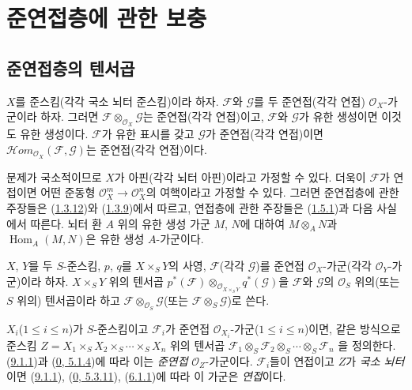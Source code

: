 \section{준연접층에 관한 보충}
\label{section:I.9-ko}

\subsection{준연접층의 텐서곱}
\label{subsection:I.9.1-ko}

\begin{proposition}[9.1.1]
\label{I.9.1.1-ko}
$X$를 준스킴(각각 국소 뇌터 준스킴)이라 하자. $\mathscr{F}$와
$\mathscr{G}$를 두 준연접(각각 연접) $\mathscr{O}_X$-가군이라 하자.
그러면 $\mathscr{F}\otimes_{\mathscr{O}_X}\mathscr{G}$는 준연접(각각
연접)이고, $\mathscr{F}$와 $\mathscr{G}$가 유한 생성이면 이것도 유한
생성이다. $\mathscr{F}$가 유한 표시를 갖고 $\mathscr{G}$가 준연접(각각
연접)이면 $\mathscr{H}\!om_{\mathscr{O}_X}(\mathscr{F},\mathscr{G})$는
준연접(각각 연접)이다.
\end{proposition}

문제가 국소적이므로 $X$가 아핀(각각 뇌터 아핀)이라고 가정할 수 있다.
더욱이 $\mathscr{F}$가 연접이면 어떤 준동형
$\mathscr{O}_X^m\to\mathscr{O}_X^n$의 여핵이라고 가정할 수 있다.
그러면 준연접층에 관한 주장들은
(\hyperref[I.1.3.12-ko]{1.3.12})와
(\hyperref[I.1.3.9-ko]{1.3.9})에서 따르고, 연접층에 관한 주장들은
(\hyperref[I.1.5.1-ko]{1.5.1})과 다음 사실에서 따른다. 뇌터 환 $A$
위의 유한 생성 가군 $M$, $N$에 대하여 $M\otimes_A N$과
$\operatorname{Hom}_A(M,N)$은 유한 생성 $A$-가군이다.

\begin{definition}[9.1.2]
\label{I.9.1.2-ko}
$X$, $Y$를 두 $S$-준스킴, $p$, $q$를 $X\times_S Y$의 사영,
$\mathscr{F}$(각각 $\mathscr{G}$)를 준연접 $\mathscr{O}_X$-가군(각각
$\mathscr{O}_Y$-가군)이라 하자. $X\times_S Y$ 위의 텐서곱
$p^*(\mathscr{F})\otimes_{\mathscr{O}_{X\times_S Y}}q^*(\mathscr{G})$을
$\mathscr{F}$와 $\mathscr{G}$의 $\mathscr{O}_S$ 위의(또는 $S$
위의) 텐서곱이라 하고
$\mathscr{F}\otimes_{\mathscr{O}_S}\mathscr{G}$(또는
$\mathscr{F}\otimes_S\mathscr{G}$)로 쓴다.
\end{definition}

$X_i$($1\leq i\leq n$)가 $S$-준스킴이고 $\mathscr{F}_i$가 준연접
$\mathscr{O}_{X_i}$-가군($1\leq i\leq n$)이면, 같은 방식으로 준스킴
$Z=X_1\times_S X_2\times_S\cdots\times_S X_n$ 위의 텐서곱
$\mathscr{F}_1\otimes_S\mathscr{F}_2\otimes_S\cdots\otimes_S\mathscr{F}_n$
을 정의한다. (\hyperref[I.9.1.1-ko]{9.1.1})과
(\hyperref[0.5.1.4-ko]{0, 5.1.4})에 따라 이는
\emph{준연접} $\mathscr{O}_Z$-가군이다. $\mathscr{F}_i$들이 연접이고
$Z$가 \emph{국소 뇌터}이면 (\hyperref[I.9.1.1-ko]{9.1.1}),
(\hyperref[0.5.3.11-ko]{0, 5.3.11}),
(\hyperref[I.6.1.1-ko]{6.1.1})에 따라 이 가군은 \emph{연접}이다.

